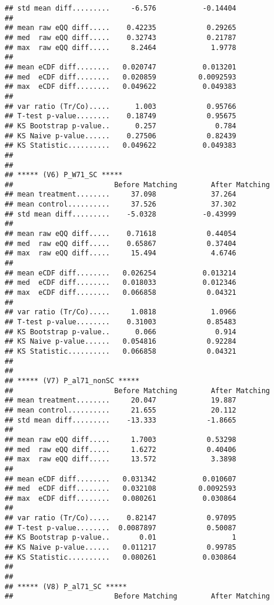 \documentclass[
]{article}
\begin{document}
\begin{verbatim}
## std mean diff.........     -6.576           -0.14404 
## 
## mean raw eQQ diff.....    0.42235            0.29265 
## med  raw eQQ diff.....    0.32743            0.21787 
## max  raw eQQ diff.....     8.2464             1.9778 
## 
## mean eCDF diff........   0.020747           0.013201 
## med  eCDF diff........   0.020859          0.0092593 
## max  eCDF diff........   0.049622           0.049383 
## 
## var ratio (Tr/Co).....      1.003            0.95766 
## T-test p-value........    0.18749            0.95675 
## KS Bootstrap p-value..      0.257              0.784 
## KS Naive p-value......    0.27506            0.82439 
## KS Statistic..........   0.049622           0.049383 
## 
## 
## ***** (V6) P_W71_SC *****
##                        Before Matching        After Matching
## mean treatment........     37.098             37.264 
## mean control..........     37.526             37.302 
## std mean diff.........    -5.0328           -0.43999 
## 
## mean raw eQQ diff.....    0.71618            0.44054 
## med  raw eQQ diff.....    0.65867            0.37404 
## max  raw eQQ diff.....     15.494             4.6746 
## 
## mean eCDF diff........   0.026254           0.013214 
## med  eCDF diff........   0.018033           0.012346 
## max  eCDF diff........   0.066858            0.04321 
## 
## var ratio (Tr/Co).....     1.0818             1.0966 
## T-test p-value........    0.31003            0.85483 
## KS Bootstrap p-value..      0.066              0.914 
## KS Naive p-value......   0.054816            0.92284 
## KS Statistic..........   0.066858            0.04321 
## 
## 
## ***** (V7) P_al71_nonSC *****
##                        Before Matching        After Matching
## mean treatment........     20.047             19.887 
## mean control..........     21.655             20.112 
## std mean diff.........    -13.333            -1.8665 
## 
## mean raw eQQ diff.....     1.7003            0.53298 
## med  raw eQQ diff.....     1.6272            0.40406 
## max  raw eQQ diff.....     13.572             3.3898 
## 
## mean eCDF diff........   0.031342           0.010607 
## med  eCDF diff........   0.032108          0.0092593 
## max  eCDF diff........   0.080261           0.030864 
## 
## var ratio (Tr/Co).....    0.82147            0.97095 
## T-test p-value........  0.0087897            0.50087 
## KS Bootstrap p-value..       0.01                  1 
## KS Naive p-value......   0.011217            0.99785 
## KS Statistic..........   0.080261           0.030864 
## 
## 
## ***** (V8) P_al71_SC *****
##                        Before Matching        After Matching

\end{verbatim}
\end{document}
